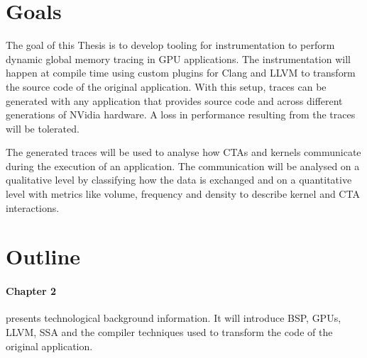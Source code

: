 %	
\section{Goals}
The goal of this Thesis is to develop tooling for instrumentation to perform dynamic global memory tracing in GPU applications. The instrumentation will happen at compile time using custom plugins for Clang and LLVM to transform the source code of the
original application. With this setup, traces can be generated with any application that provides source code and
across different generations of NVidia hardware. A loss in performance resulting from the traces will be tolerated.

The generated traces will be used to analyse how CTAs and kernels communicate during the execution of an application. 
The communication will be analysed on a qualitative level by classifying how the data is exchanged and on a quantitative level with metrics like volume, frequency and density to describe kernel and CTA interactions.


\section{Outline}
	\paragraph{Chapter 2} presents technological background information. It will introduce BSP, GPUs, LLVM, SSA and the compiler techniques used to transform the code of the original application.
